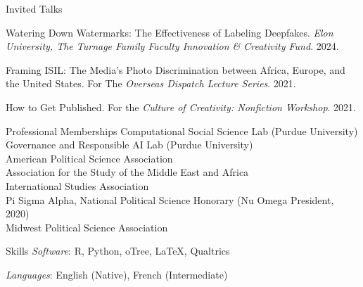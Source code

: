 \documentclass{resume} %
\begin{document}

\begin{rSection}{Invited Talks}

Watering Down Watermarks: The Effectiveness of Labeling Deepfakes. \textit{Elon University, The Turnage Family Faculty Innovation \& Creativity Fund}. 2024.

Framing ISIL: The Media's Photo Discrimination between Africa, Europe, and the United States. For The \emph{Overseas Dispatch Lecture Series}. 2021.

How to Get Published. For the \emph{Culture of Creativity: Nonfiction Workshop}. 2021.

\end{rSection}

\begin{rSection} {Professional Memberships}
Computational Social Science Lab (Purdue University)
\\Governance and Responsible AI Lab (Purdue University)
\\American Political Science Association
\\Association for the Study of the Middle East and Africa
\\International Studies Association
\\Pi Sigma Alpha, National Political Science Honorary (Nu Omega President, 2020)
\\Midwest Political Science Association

\end{rSection}

\begin{rSection}{Skills}
{\it Software}: R, Python, oTree, \LaTeX, Qualtrics



{\it Languages}: English (Native), French (Intermediate)

\end{rSection}
\end{document}
